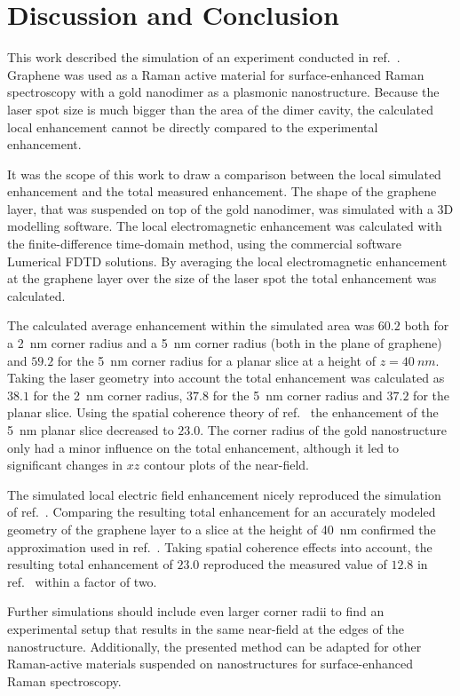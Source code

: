 \newpage
\section{Discussion and Conclusion}

This work described the simulation of an experiment conducted in ref.~\cite{heeg}. Graphene was used as a Raman active material for surface-enhanced Raman spectroscopy with a gold nanodimer as a plasmonic nanostructure. Because the laser spot size is much bigger than the area of the dimer cavity, the calculated local enhancement cannot be directly compared to the experimental enhancement.

It was the scope of this work to draw a comparison between the local simulated enhancement and the total measured enhancement. The shape of the graphene layer, that was suspended on top of the gold nanodimer, was simulated with a 3D modelling software. The local electromagnetic enhancement was calculated with the finite-difference time-domain method, using the commercial software Lumerical FDTD solutions. By averaging the local electromagnetic enhancement at the graphene layer over the size of the laser spot the total enhancement was calculated.

The calculated average enhancement within the simulated area was $60.2$  both for a \SI{2}{nm} corner radius and a \SI{5}{nm} corner radius (both in the plane of graphene) and $59.2$ for the \SI{5}{nm} corner radius for a planar slice at a height of $z=\SI{40}{nm}$. Taking the laser geometry into account the total enhancement was calculated as $38.1$ for the \SI{2}{nm} corner radius, $37.8$ for the \SI{5}{nm} corner radius and $37.2$ for the planar slice. Using the spatial coherence theory of ref.~\cite{coherence} the enhancement of the \SI{5}{nm} planar slice decreased to $23.0$. The corner radius of the gold nanostructure only had a minor influence on the total enhancement, although it led to significant changes in $xz$ contour plots of the near-field.

The simulated local electric field enhancement nicely reproduced the simulation of ref.~\cite{heeg}. Comparing the resulting total enhancement for an accurately modeled geometry of the graphene layer to a slice at the height of \SI{40}{nm} confirmed the approximation used in ref.~\cite{heeg}. Taking spatial coherence effects into account, the resulting total enhancement of $23.0$ reproduced the measured value of $12.8$ in ref.~\cite{heeg} within a factor of two.

Further simulations should include even larger corner radii to find an experimental setup that results in the same near-field at the edges of the nanostructure. Additionally, the presented method can be adapted for other Raman-active materials suspended on nanostructures for
surface-enhanced Raman spectroscopy.
